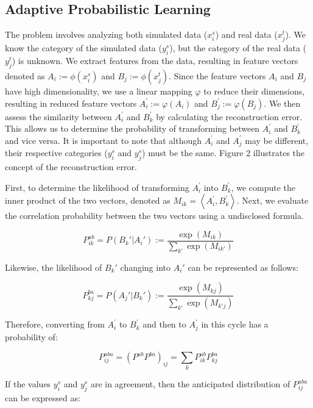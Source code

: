 \documentclass[conference]{IEEEtran}
\begin{document}
\subsection{Adaptive Probabilistic Learning}

The problem involves analyzing both simulated data ($x_{i}^{s}$) and real data ($x_{j}^{t}$). We know the category of the simulated data ($y_{i}^{s}$), but the category of the real data ($y_{j}^{t}$) is unknown. We extract features from the data, resulting in feature vectors denoted as $A_{i}:=\phi\left(x_{i}^{s}\right)$ and $B_{j}:=\phi\left(x_{j}^{t}\right)$. Since the feature vectors $A_{i}$ and $B_{j}$ have high dimensionality, we use a linear mapping $\varphi$ to reduce their dimensions, resulting in reduced feature vectors $A_{i}^{\prime}:=\varphi\left(A_{i}\right)$ and $B_{j}^{\prime}:=\varphi\left(B_{j}\right)$. We then assess the similarity between $A_{i}^{\prime}$ and $B_{k}^{\prime}$ by calculating the reconstruction error. This allows us to determine the probability of transforming between $A_{i}^{\prime}$ and $B_{k}^{\prime}$ and vice versa. It is important to note that although $A_{i}^{\prime}$ and $A_{j}^{\prime}$ may be different, their respective categories ($y_{i}^{s}$ and $y_{j}^{s}$) must be the same. Figure 2 illustrates the concept of the reconstruction error.

First, to determine the likelihood of transforming $A_{i}^{\prime}$ into $B_{k}^{\prime}$, we compute the inner product of the two vectors, denoted as $M_{ik}=\left\langle A_{i}^{\prime}, B_{k}^{\prime}\right\rangle$. Next, we evaluate the correlation probability between the two vectors using a undisclosed formula.

$$
P_{i k}^{a b}=P(B_{k}'|A_{i}'):=\frac{\exp(M_{i k})}{\sum_{k'} \exp(M_{i k'})}
$$

Likewise, the likelihood of $B_{k}'$ changing into $A_{i}'$ can be represented as follows:

$$
P_{k j}^{b a}=P(A_{j}'|B_{k}'):=\frac{\exp(M_{k j})}{\sum_{k'} \exp(M_{k' j})}
$$

Therefore, converting from $A_{i}^{\prime}$ to $B_{k}^{\prime}$ and then to $A_{j}^{\prime}$ in this cycle has a probability of:

$$
P_{i j}^{a b a}=\left(P^{a b} P^{b a}\right)_{i j}=\sum_{k} P_{i k}^{a b} P_{k j}^{b a}
$$

If the values $y_{i}^{s}$ and $y_{j}^{s}$ are in agreement, then the anticipated distribution of $P_{i j}^{a b a}$ can be expressed as:
\end{document}
